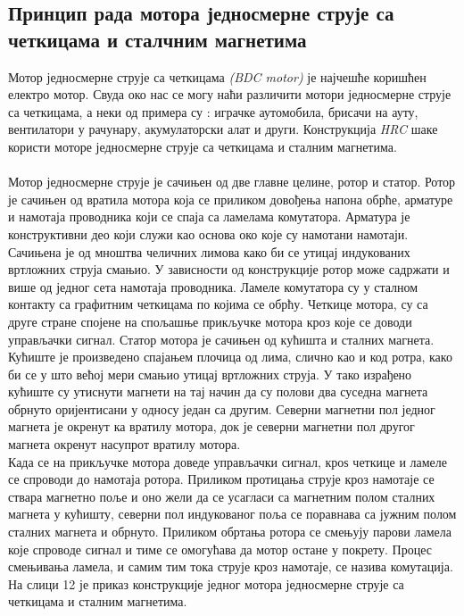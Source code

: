 \documentclass{article}
\begin{document}
\subsection{Принцип рада мотора једносмерне струје са четкицама и сталчним магнетима}
Мотор једносмерне струје са четкицама \textit{(BDC motor)} је најчешће коришћен електро мотор. Свуда око нас се могу наћи различити мотори једносмерне струје
са четкицама, а неки од примера су : играчке аутомобила, брисачи на ауту, вентилатори у рачунару, акумулаторски алат и други. 
Конструкција \textit{HRC} шаке користи моторе једносмерне струје са четкицама и сталним магнетима.\ \\ \\ 
Мотор једносмерне струје је сачињен од две главне целине, ротор и статор. Ротор је сачињен од вратила мотора која се приликом довођења напона обрће, арматуре и намотаја проводника који се спаја са ламелама комутатора. Арматура је конструктивни део који служи као основа око које су намотани намотаји. Сачињена је од мноштва челичних лимова како би се утицај индукованих вртложних струја смањио. У зависности од конструкције ротор може садржати и више од једног сета намотаја проводника. Ламеле комутатора су у сталном контакту са графитним четкицама по којима се обрћу. Четкице мотора, су са друге стране спојене на спољашње прикључке мотора кроз које се доводи управљачки сигнал. Статор мотора је сачињен од кућишта и сталних магнета. Кућиште је произведено спајањем плочица од лима, слично као и код ротра, како би се у што већој мери смањио утицај вртложних струја. У тако израђено кућиште су утиснути магнети на тај начин да су полови два суседна магнета обрнуто оријентисани у односу један са другим. Северни магнетни пол једног магнета је окренут ка вратилу мотора, док је северни магнетни пол другог магнета окренут насупрот вратилу мотора. \\
Када се на прикључке мотора доведе управљачки сигнал, кроѕ четкице и ламеле се спроводи до намотаја ротора. Приликом протицања струје кроз намотаје се ствара магнетно поље и оно жели да се усагласи са магнетним полом сталних магнета у кућишту, северни пол индукованог поља се поравнава са јужним полом сталних магнета и обрнуто. Приликом обртања ротора се смењују парови ламела које спроводе сигнал и тиме се омогућава да мотор остане у покрету. Процес смењивања ламела, и самим тим тока струје кроз намотаје, се назива комутација. На слици 12 је приказ конструкције једног мотора једносмерне струје са четкицама и сталним магнетима.\ \\
\\
\end{document}
